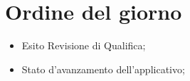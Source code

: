 \section{Ordine del giorno}
\begin{itemize}
\item Esito Revisione di Qualifica;
\item Stato d'avanzamento dell'applicativo;
\end{itemize}